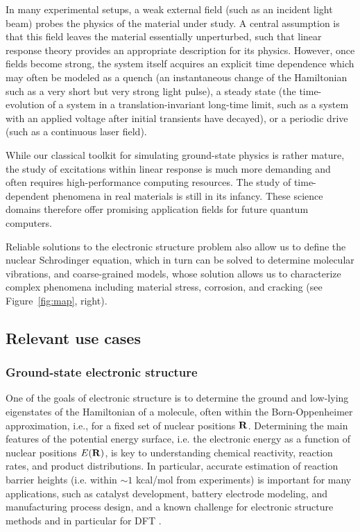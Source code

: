 In many experimental setups, a weak external field (such as an incident light beam) probes the physics of the material under study. A central assumption is that this field leaves the material essentially unperturbed, such that linear response theory provides an appropriate description for its physics. However, once fields become strong, the system itself acquires an explicit time dependence which may often be modeled as a quench (an instantaneous change of the Hamiltonian such as a very short but very strong light pulse), a steady state (the time-evolution of a system in a translation-invariant long-time limit, such as a system with an applied voltage after initial transients have decayed), or a periodic drive (such as a continuous laser field).

While our classical toolkit for simulating ground-state physics is rather mature, the study of excitations within linear response is much more demanding and often requires high-performance computing resources. The study of time-dependent phenomena in real materials is still in its infancy. These science domains therefore offer promising application fields for future quantum computers. 

Reliable solutions to the electronic structure problem also allow us to define the nuclear Schrodinger equation, which in turn can be solved to determine molecular vibrations, and coarse-grained models, whose solution allows us to characterize complex phenomena including material stress, corrosion, and cracking (see Figure~\ref{fig:map}, right).

\subsection{Relevant use cases}

\subsubsection{Ground-state electronic structure}

One of the goals of electronic structure is to determine the ground and low-lying eigenstates of the Hamiltonian of a molecule, often within the Born-Oppenheimer approximation, i.e., for a fixed set of nuclear positions ${\bf{R}}$.
Determining the main features of the potential energy surface, i.e. the electronic energy as a function of nuclear positions $E({\bf{R}})$, is key to understanding chemical reactivity, reaction rates, and product distributions.
In particular, accurate estimation of reaction barrier heights (i.e. within $\sim 1$ kcal/mol from experiments) is important for many applications, such as catalyst development, battery electrode modeling, and manufacturing process design,
and a known challenge for electronic structure methods and in particular for DFT \cite{cohen2012challenges}.

